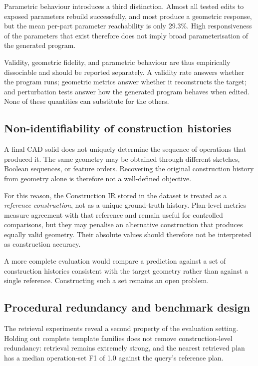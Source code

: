 \documentclass[preprint,12pt]{elsarticle}
\begin{document}
Parametric behaviour introduces a third distinction. Almost all tested edits
to exposed parameters rebuild successfully, and most produce a geometric
response, but the mean per-part parameter reachability is only $29.3\%$.
High responsiveness of the parameters that exist therefore does not imply
broad parameterisation of the generated program.

Validity, geometric fidelity, and parametric behaviour are thus empirically
dissociable and should be reported separately. A validity rate answers whether
the program runs; geometric metrics answer whether it reconstructs the target;
and perturbation tests answer how the generated program behaves when edited.
None of these quantities can substitute for the others.


\subsection{Non-identifiability of construction histories}
\label{sec:non_identifiable}

A final CAD solid does not uniquely determine the sequence of operations that
produced it. The same geometry may be obtained through different sketches,
Boolean sequences, or feature orders. Recovering the original construction
history from geometry alone is therefore not a well-defined objective.

For this reason, the Construction IR stored in the dataset is treated as a
\emph{reference construction}, not as a unique ground-truth history.
Plan-level metrics measure agreement with that reference and remain useful for
controlled comparisons, but they may penalise an alternative construction that
produces equally valid geometry. Their absolute values should therefore not be
interpreted as construction accuracy.

A more complete evaluation would compare a prediction against a set of
construction histories consistent with the target geometry rather than against
a single reference. Constructing such a set remains an open problem.


\subsection{Procedural redundancy and benchmark design}
\label{sec:benchmark_redundancy}

The retrieval experiments reveal a second property of the evaluation setting.
Holding out complete template families does not remove construction-level
redundancy: retrieval remains extremely strong, and the nearest retrieved plan
has a median operation-set F1 of 1.0 against the query's reference plan.
\end{document}
